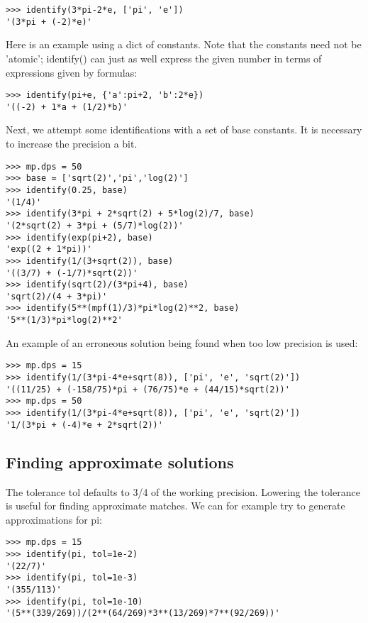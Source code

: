 \begin{lstlisting}
>>> identify(3*pi-2*e, ['pi', 'e'])
'(3*pi + (-2)*e)'
\end{lstlisting}


Here is an example using a dict of constants. Note that the constants need not be 'atomic'; identify() can just as well express the given number in terms of expressions given by formulas:

\begin{lstlisting}
>>> identify(pi+e, {'a':pi+2, 'b':2*e})
'((-2) + 1*a + (1/2)*b)'
\end{lstlisting}


Next, we attempt some identifications with a set of base constants. It is necessary to increase the precision a bit.

\begin{lstlisting}
>>> mp.dps = 50
>>> base = ['sqrt(2)','pi','log(2)']
>>> identify(0.25, base)
'(1/4)'
>>> identify(3*pi + 2*sqrt(2) + 5*log(2)/7, base)
'(2*sqrt(2) + 3*pi + (5/7)*log(2))'
>>> identify(exp(pi+2), base)
'exp((2 + 1*pi))'
>>> identify(1/(3+sqrt(2)), base)
'((3/7) + (-1/7)*sqrt(2))'
>>> identify(sqrt(2)/(3*pi+4), base)
'sqrt(2)/(4 + 3*pi)'
>>> identify(5**(mpf(1)/3)*pi*log(2)**2, base)
'5**(1/3)*pi*log(2)**2'
\end{lstlisting}


An example of an erroneous solution being found when too low precision is used:

\begin{lstlisting}
>>> mp.dps = 15
>>> identify(1/(3*pi-4*e+sqrt(8)), ['pi', 'e', 'sqrt(2)'])
'((11/25) + (-158/75)*pi + (76/75)*e + (44/15)*sqrt(2))'
>>> mp.dps = 50
>>> identify(1/(3*pi-4*e+sqrt(8)), ['pi', 'e', 'sqrt(2)'])
'1/(3*pi + (-4)*e + 2*sqrt(2))'
\end{lstlisting}



\subsection{Finding approximate solutions}

The tolerance tol defaults to 3/4 of the working precision. Lowering the tolerance is useful for finding approximate matches. We can for example try to generate approximations for pi:

\begin{lstlisting}
>>> mp.dps = 15
>>> identify(pi, tol=1e-2)
'(22/7)'
>>> identify(pi, tol=1e-3)
'(355/113)'
>>> identify(pi, tol=1e-10)
'(5**(339/269))/(2**(64/269)*3**(13/269)*7**(92/269))'
\end{lstlisting}


